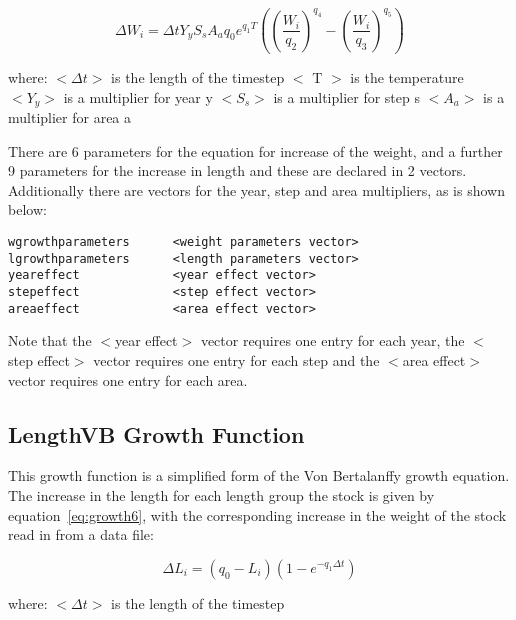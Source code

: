 \documentclass[10pt,twoside]{book}
\begin{document}
\begin{equation}\label{eq:growth5w}
\Delta W_{i} = \Delta t Y_{y} S_{s} A_{a} q_{0} e^{q_{1}T} \left( \left( \frac{W_{i}}{q_{2}} \right)^{q_{4}} - \left( \frac{W_{i}}{q_{3}} \right)^{q_{5}} \right)
\end{equation}

where:\newline
$<\Delta t>$ is the length of the timestep\newline
$<$ T $>$ is the temperature\newline
$<Y_{y}>$ is a multiplier for year y\newline
$<S_{s}>$ is a multiplier for step s\newline
$<A_{a}>$ is a multiplier for area a

\bigskip
There are 6 parameters for the equation for increase of the weight, and a further 9 parameters for the increase in length and these are declared in 2 vectors.  Additionally there are vectors for the year, step and area multipliers, as is shown below:

{\small\begin{verbatim}
wgrowthparameters      <weight parameters vector>
lgrowthparameters      <length parameters vector>
yeareffect             <year effect vector>
stepeffect             <step effect vector>
areaeffect             <area effect vector>
\end{verbatim}}

Note that the $<$year effect$>$ vector requires one entry for each year, the $<$step effect$>$ vector requires one entry for each step and the $<$area effect$>$ vector requires one entry for each area.

\subsection{LengthVB Growth Function}\label{subsec:growth6}
This growth function is a simplified form of the Von Bertalanffy growth equation.  The increase in the length for each length group the stock is given by equation~\ref{eq:growth6}, with the corresponding increase in the weight of the stock read in from a data file:

\begin{equation}\label{eq:growth6}
\Delta L_{i} = \left( q_{0} - L_{i} \right) \left( 1 - e^{-q_{1} \Delta t} \right)
\end{equation}

where:\newline
$<\Delta t>$ is the length of the timestep
\end{document}
